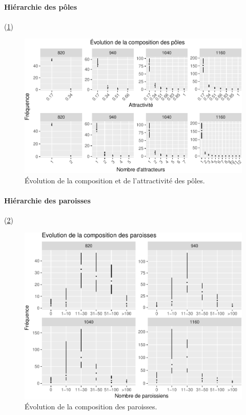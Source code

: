 \documentclass[12pt, a4paper, oneside]{book}
\begin{document}
	\paragraph{Hiérarchie des pôles}
	
		\begin{mdframed}[backgroundcolor=gray!10,footnoteinside=false]
			(\cref{fig:compo-poles-v0})
		\end{mdframed}
	
	\begin{figure}[H]
		\captionsetup{width=\linewidth}
		\includegraphics[width=\linewidth]{img/resultats/v0_compo_poles.pdf}
		\caption{Évolution de la composition et de l'attractivité des pôles.} 
		\label{fig:compo-poles-v0} 
	\end{figure}
	
	\paragraph{Hiérarchie des paroisses}
	
	\begin{mdframed}[backgroundcolor=gray!10,footnoteinside=false]
		(\cref{fig:compo-paroisses-v0})
	\end{mdframed}
	
	\begin{figure}[H]
		\captionsetup{width=\linewidth}
		\includegraphics[width=\linewidth]{img/resultats/v0_compo_paroisses.pdf}
		\caption{Évolution de la composition des paroisses.} 
		\label{fig:compo-paroisses-v0} 
	\end{figure}
	
\end{document}
